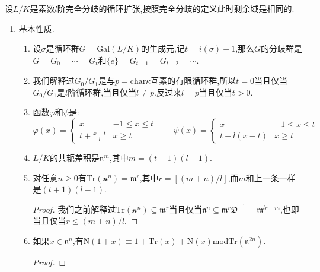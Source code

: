 设$L/K$是素数$l$阶完全分歧的循环扩张,按照完全分歧的定义此时剩余域是相同的.
\begin{enumerate}
	\item 基本性质.
	\begin{enumerate}
		\item 设$\sigma$是循环群$G=\mathrm{Gal}(L/K)$的生成元,记$t=i(\sigma)-1$,那么$G$的分歧群是$G=G_0=\cdots=G_t$和$\{e\}=G_{t+1}=G_{t+2}=\cdots$.
		\item 我们解释过$G_0/G_1$是与$p=\mathrm{char}\kappa$互素的有限循环群,所以$t=0$当且仅当$G_0/G_1$是$l$阶循环群,当且仅当$l\not=p$.反过来$l=p$当且仅当$t>0$.
		\item 函数$\varphi$和$\psi$是:
		$$\varphi(x)=\left\{\begin{array}{cc}x&-1\le x\le t\\t+\frac{x-t}{l}&x\ge t\end{array}\right.\qquad\psi(x)=\left\{\begin{array}{cc}x&-1\le x\le t\\t+l(x-t)&x\ge t\end{array}\right.$$
		\item $L/K$的共轭差积是$\mathfrak{n}^m$,其中$m=(t+1)(l-1)$.
		\item 对任意$n\ge0$有$\mathrm{Tr}(\mathscr{n}^n)=\mathfrak{m}^r$,其中$r=[(m+n)/l]$,而$m$和上一条一样是$(t+1)(l-1)$.
		\begin{proof}
			
			我们之前解释过$\mathrm{Tr}(\mathscr{n}^n)\subseteq\mathfrak{m}^r$当且仅当$\mathfrak{n}^n\subseteq\mathfrak{m}^r\mathfrak{D}^{-1}=\mathfrak{m}^{lr-m}$,也即当且仅当$r\le(m+n)/l$.
		\end{proof}
	    \item 如果$x\in\mathfrak{n}^n$,有$\mathrm{N}(1+x)\equiv1+\mathrm{Tr}(x)+\mathrm{N}(x)\mathrm{mod}\mathrm{Tr}(\mathfrak{n}^{2n})$.
	    \begin{proof}
	    	

\end{proof}
\end{enumerate}
\end{enumerate}
